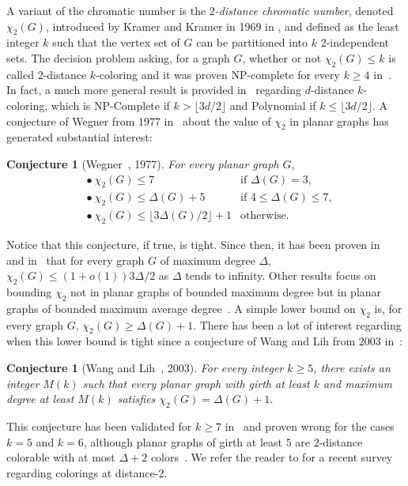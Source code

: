\documentclass{article}
\newtheorem{conjecture}[theorem]{Conjecture}
\begin{document}
A variant of the chromatic number is the \emph{$2$-distance chromatic number}, denoted $\chi_2(G)$, introduced by Kramer and Kramer in 1969 in \cite{kramer1969probleme}, and defined as the least integer $k$ such that the vertex set of $G$ can be partitioned into $k$ $2$-independent sets. The decision problem asking, for a graph $G$, whether or not $\chi_2(G) \leq k$ is called {\sc $2$-distance $k$-coloring} and it was proven NP-complete for every $k \geq 4$ in~\cite{sharp2007distance}. In fact, a much more general result is provided in~\cite{sharp2007distance} regarding {\sc$d$-distance $k$-coloring}, which is NP-Complete if $k > \lfloor 3d/2 \rfloor$ and Polynomial if $k \leq \lfloor 3d/2 \rfloor$. A conjecture of Wegner from 1977 in~\cite{wegner1977graphs} about the value of $\chi_2$ in planar graphs has generated substantial interest:

\begin{conjecture}[Wegner~\cite{wegner1977graphs}, 1977]
For every planar graph $G$,
\begin{align*}
    &\bullet~\chi_2(G) \leq 7 & \textrm{if } \Delta(G) = 3, \\
    &\bullet~\chi_2(G) \leq \Delta(G) + 5 & \textrm{if } 4 \leq \Delta(G) \leq 7, \\
    &\bullet~\chi_2(G) \leq \lfloor 3\Delta(G)/2\rfloor + 1 & \textrm{otherwise.}
\end{align*}
\end{conjecture}

Notice that this conjecture, if true, is tight.
Since then, it has been proven in~\cite{amini2013unified} and in~\cite{havet2017listcolouringsquaresplanar} that for every graph $G$ of maximum degree $\Delta$, $\chi_2(G) \leq (1 + o(1))3\Delta/2$ as $\Delta$ tends to infinity. Other results focus on bounding $\chi_2$ not in planar graphs of bounded maximum degree but in planar graphs of bounded maximum average degree~\cite{bonamy20142, la20252}. A simple lower bound on $\chi_2$ is, for every graph $G$, $\chi_2(G) \geq \Delta(G) + 1$. There has been a lot of interest regarding when this lower bound is tight since a conjecture of Wang and Lih from 2003 in~\cite{Wang_and_Lih}:

\begin{conjecture}[Wang and Lih~\cite{Wang_and_Lih}, 2003]
    For every integer $k \geq 5$, there exists an integer $M(k)$ such that every planar graph with girth at least $k$ and maximum degree at least $M(k)$ satisfies $\chi_2(G) = \Delta(G) + 1$.
\end{conjecture}
This conjecture has been validated for $k \geq 7$ in~\cite{Borodin2004, Borodin2004_2, DVORAK2008838, DVORAK20092634} and proven wrong for the cases $k = 5$ and $k = 6$, although planar graphs of girth at least $5$ are $2$-distance colorable with at most $\Delta + 2$ colors~\cite{BONAMY2019218}. We refer the reader to \cite{cranston2022coloring} for a recent survey regarding colorings at distance-2.
\end{document}
